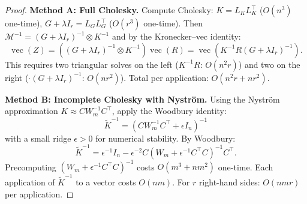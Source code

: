 \begin{proof}
\textbf{Method A: Full Cholesky.}
Compute Cholesky: $K = L_K L_K^\top$ ($O(n^3)$ one-time),
$G + \lambda I_r = L_G L_G^\top$ ($O(r^3)$ one-time).
Then $\mathcal{M}^{-1} = (G + \lambda I_r)^{-1}\otimes K^{-1}$ and by
the Kronecker--vec identity:
\[
  \operatorname{vec}(Z) = ((G+\lambda I_r)^{-1}\otimes K^{-1})\operatorname{vec}(R)
  = \operatorname{vec}(K^{-1}R(G+\lambda I_r)^{-1}).
\]
This requires two triangular solves on the left ($K^{-1}R$: $O(n^2 r)$)
and two on the right ($\cdot(G+\lambda I_r)^{-1}$: $O(nr^2)$). Total
per application: $O(n^2 r + nr^2)$.

\textbf{Method B: Incomplete Cholesky with Nystr\"om.}
Using the Nystr\"om approximation $K \approx CW_m^{-1}C^\top$, apply
the Woodbury identity:
\[
  \widetilde{K}^{-1} = (CW_m^{-1}C^\top + \epsilon I_n)^{-1}
\]
with a small ridge $\epsilon > 0$ for numerical stability. By Woodbury:
\[
  \widetilde{K}^{-1} = \epsilon^{-1}I_n
  - \epsilon^{-2}C(W_m + \epsilon^{-1}C^\top C)^{-1}C^\top.
\]
Precomputing $(W_m + \epsilon^{-1}C^\top C)^{-1}$ costs $O(m^3 + nm^2)$
one-time. Each application of $\widetilde{K}^{-1}$ to a vector costs $O(nm)$.
For $r$ right-hand sides: $O(nmr)$ per application.
\end{proof}

\begin{center}
\end{center}

